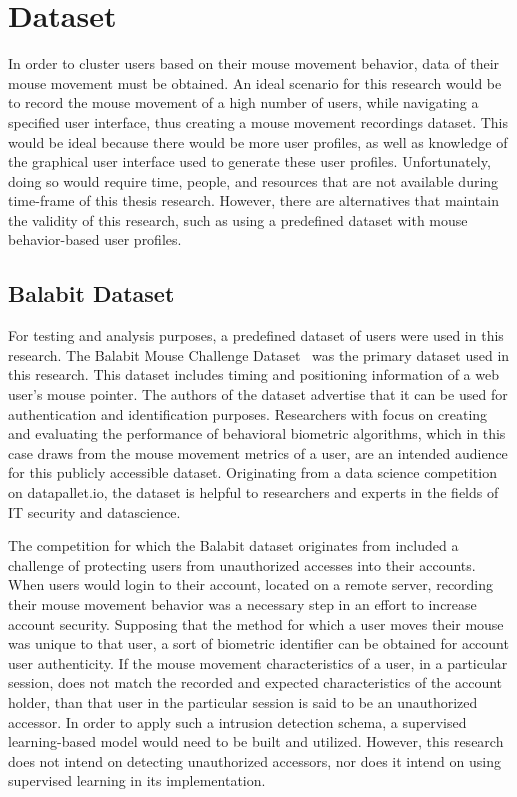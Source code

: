 
\section{Dataset}\label{sec:dataset}
In order to cluster users based on their mouse movement behavior, data of their mouse movement must be obtained.
An ideal scenario for this research would be to record the mouse movement of a high number of users, while navigating a specified user interface, thus creating a mouse movement recordings dataset.
This would be ideal because there would be more user profiles, as well as knowledge of the graphical user interface used to generate these user profiles.
Unfortunately, doing so would require time, people, and resources that are not available during time-frame of this thesis research.
However, there are alternatives that maintain the validity of this research, such as using a predefined dataset with mouse behavior-based user profiles.

\subsection{Balabit Dataset}\label{subsec:balabit-dataset}
For testing and analysis purposes, a predefined dataset of users were used in this research.
The Balabit Mouse Challenge Dataset~\cite{balabit_dataset} was the primary dataset used in this research.
This dataset includes timing and positioning information of a web user's mouse pointer.
The authors of the dataset advertise that it can be used for authentication and identification purposes.
Researchers with focus on creating and evaluating the performance of behavioral biometric algorithms, which in this case draws from the mouse movement metrics of a user, are an intended audience for this publicly accessible dataset.
Originating from a data science competition on datapallet.io, the dataset is helpful to researchers and experts in the fields of IT security and datascience.

The competition for which the Balabit dataset originates from included a challenge of protecting users from unauthorized accesses into their accounts.
When users would login to their account, located on a remote server, recording their mouse movement behavior was a necessary step in an effort to increase account security.
Supposing that the method for which a user moves their mouse was unique to that user, a sort of biometric identifier can be obtained for account user authenticity.
If the mouse movement characteristics of a user, in a particular session, does not match the recorded and expected characteristics of the account holder, than that user in the particular session is said to be an unauthorized accessor.
In order to apply such a intrusion detection schema, a supervised learning-based model would need to be built and utilized.
However, this research does not intend on detecting unauthorized accessors, nor does it intend on using supervised learning in its implementation.

